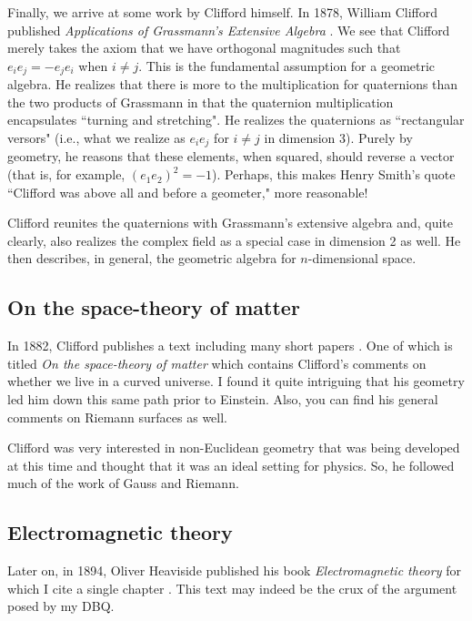 \documentclass[12pt]{article}
\begin{document}
Finally, we arrive at some work by Clifford himself. In 1878, William Clifford published \emph{Applications of Grassmann's Extensive Algebra} \cite{clifford_applications_1878}. We see that Clifford merely takes the axiom that we have orthogonal magnitudes such that $e_i e_j = -e_j e_i$ when $i\neq j$. This is the fundamental assumption for a geometric algebra. He realizes that there is more to the multiplication for quaternions than the two products of Grassmann in that the quaternion multiplication encapsulates ``turning and stretching". He realizes the quaternions as ``rectangular versors" (i.e., what we realize as $e_i e_j$ for $i\neq j$ in dimension 3). Purely by geometry, he reasons that these elements, when squared, should reverse a vector (that is, for example, $(e_1 e_2)^2=-1$). Perhaps, this makes Henry Smith's quote ``Clifford was above all and before a geometer," more reasonable!

Clifford reunites the quaternions with Grassmann's extensive algebra and, quite clearly, also realizes the complex field as a special case in dimension 2 as well. He then describes, in general, the geometric algebra for $n$-dimensional space.

\newpage
\subsection{On the space-theory of matter}

In 1882, Clifford publishes a text including many short papers \cite{clifford_1882}. One of which is titled \emph{On the space-theory of matter} which contains Clifford's comments on whether we live in a curved universe. I found it quite intriguing that his geometry led him down this same path prior to Einstein. Also, you can find his general comments on Riemann surfaces as well.

Clifford was very interested in non-Euclidean geometry that was being developed at this time and thought that it was an ideal setting for physics. So, he followed much of the work of Gauss and Riemann.


\newpage
\subsection{Electromagnetic theory}

Later on, in 1894, Oliver Heaviside published his book \emph{Electromagnetic theory} for which I cite a single chapter \cite{heaviside_2011_vec}. This text may indeed be the crux of the argument posed by my DBQ.
\end{document}

